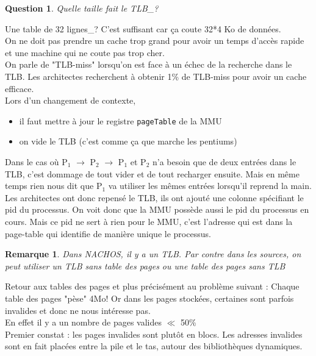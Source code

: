 \documentclass[12pt,a4paper]{report}
\newtheorem*{rem}{Remarque}
\newtheorem*{q}{Question}
\begin{document}
\begin{q}Quelle taille fait le TLB_?\end{q}
Une table de 32 lignes_? C'est suffisant car ça coute 32*4 Ko de données.\\
On ne doit pas prendre un cache trop grand pour avoir un temps d'accès rapide et une machine qui ne coute pas trop cher.\\
On parle de "TLB-miss" lorsqu’on est face à un échec de la recherche dans le TLB. Les architectes recherchent à obtenir 1\% de TLB-miss pour avoir un cache efficace.\\

Lors d'un changement de contexte,
\begin{itemize}
\item il faut mettre à jour le registre \verb?pageTable? de la MMU
\item on vide le TLB (c'est comme ça que marche les pentiums)
\end{itemize}

Dans le cas où P$_1$ $\rightarrow$ P$_2$ $\rightarrow$ P$_1$ et P$_2$ n'a besoin que de deux entrées dans le TLB, c'est dommage de tout vider et de tout recharger ensuite. Mais en même temps rien nous dit que P$_1$ va utiliser les mêmes entrées lorsqu'il reprend la main.\\

Les architectes ont donc repensé le TLB, ils ont ajouté une colonne spécifiant le pid du processus. On voit donc que la MMU possède aussi le pid du processus en cours. Mais ce pid ne sert à rien pour le MMU, c'est l'adresse qui est dans la page-table qui identifie de manière unique le processus.\\

\begin{rem} Dans NACHOS, il y a un TLB. Par contre dans les sources, on peut utiliser un TLB sans table des pages ou une table des pages sans TLB \end{rem}

Retour aux tables des pages et plus précisément au problème suivant : Chaque table des pages "pèse" 4Mo! Or dans les pages stockées, certaines sont parfois invalides et donc ne nous intéresse pas.\\
En effet il y a un nombre de pages valides $\ll$ 50\%\\


Premier constat : les pages invalides sont plutôt en blocs. Les adresses invalides sont en fait placées entre la pile et le tas, autour des bibliothèques dynamiques.
\end{document}
